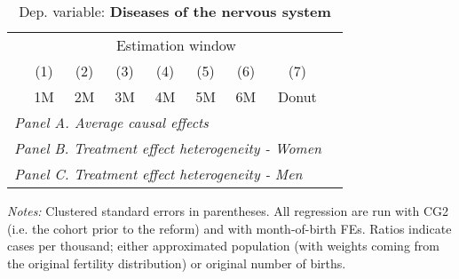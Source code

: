  \begin{table}[H] \begin{threeparttable} \centering \caption{Dep. variable: \textbf{Diseases of the nervous system}} {\def\sym#1{\ifmmode^{#1}\else\(^{#1}\)\fi} \begin{tabular}{l*{8}{c}} \toprule & \multicolumn{7}{c}{Estimation window} \\ \cmidrule(lr){2-8}
            &\multicolumn{1}{c}{(1)}&\multicolumn{1}{c}{(2)}&\multicolumn{1}{c}{(3)}&\multicolumn{1}{c}{(4)}&\multicolumn{1}{c}{(5)}&\multicolumn{1}{c}{(6)}&\multicolumn{1}{c}{(7)}\\
            &\multicolumn{1}{c}{1M}&\multicolumn{1}{c}{2M}&\multicolumn{1}{c}{3M}&\multicolumn{1}{c}{4M}&\multicolumn{1}{c}{5M}&\multicolumn{1}{c}{6M}&\multicolumn{1}{c}{Donut}\\
\midrule
 \multicolumn{8}{l}{\emph{Panel A. Average causal effects}} \\       \midrule\multicolumn{8}{l}{\emph{Panel B. Treatment effect heterogeneity - Women}} \\       \midrule\multicolumn{8}{l}{\emph{Panel C. Treatment effect heterogeneity - Men}} \\       
\bottomrule \end{tabular} } \begin{tablenotes} \item \scriptsize \emph{Notes:} Clustered standard errors in parentheses. All regression are run with CG2 (i.e. the cohort prior to the reform) and with month-of-birth FEs. Ratios indicate cases per thousand; either approximated population (with weights coming from the original fertility distribution) or original number of births. \end{tablenotes} \end{threeparttable} \end{table} 

